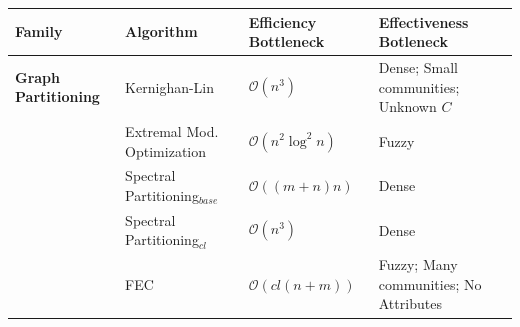 \begin{landscape}
    
      \begin{table}[t]
        {\footnotesize
        \begin{tabular}{l|lll}
          Family                                    & Algorithm                                         & Efficiency Bottleneck                     & Effectiveness Botleneck \\
          \hline
          \textbf{Graph Partitioning}               & Kernighan-Lin~\cite{Kernighan1970}                & $\mathcal{O}(n^3)$                        & Dense; Small communities; Unknown $C$ \\%
                                                    
                                                    & Extremal Mod. Optimization~\cite{Duch2005}        & $\mathcal{O}(n^2\log^2{n})$               & Fuzzy \\%
                                                    
                                                    & Spectral Partitioning$_{base}$~\cite{Newman2006}  & $\mathcal{O}((m+n)n)$                     & Dense \\%
                                                    
                                                    & Spectral Partitioning$_{cl}$~\cite{Newman2006}    & $\mathcal{O}(n^3)$                        & Dense \\%
                                                    
                                                    & FEC~\cite{Yang2007}                               & $\mathcal{O}(cl(n+m))$                     & Fuzzy; Many communities; No Attributes \\%
                                                    
  

\end{tabular}}
\end{table}
\end{landscape}
